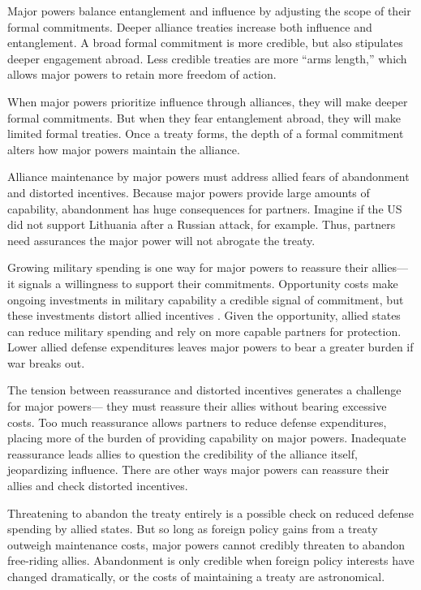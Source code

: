 \documentclass[12pt]{article}
\begin{document}
Major powers balance entanglement and influence by adjusting the scope of their formal commitments. 
Deeper alliance treaties increase both influence and entanglement. 
A broad formal commitment is more credible, but also stipulates deeper engagement abroad. 
Less credible treaties are more ``arms length,'' which allows major powers to retain more freedom of action. 


When major powers prioritize influence through alliances, they will make deeper formal commitments.
But when they fear entanglement abroad, they will make limited formal treaties. 
Once a treaty forms, the depth of a formal commitment alters how major powers maintain the alliance. 


Alliance maintenance by major powers must address allied fears of abandonment and distorted incentives. 
Because major powers provide large amounts of capability, abandonment has huge consequences for partners. 
Imagine if the US did not support Lithuania after a Russian attack, for example. 
Thus, partners need assurances the major power will not abrogate the treaty. 


Growing military spending is one way for major powers to reassure their allies--- it signals a willingness to support their commitments. 
Opportunity costs make ongoing investments in military capability a credible signal of commitment, but these investments distort allied incentives \citep{Lake1996, Lake2009}. 
Given the opportunity, allied states can reduce military spending and rely on more capable partners for protection.
Lower allied defense expenditures leaves major powers to bear a greater burden if war breaks out. 


The tension between reassurance and distorted incentives generates a challenge for major powers--- they must reassure their allies without bearing excessive costs.
Too much reassurance allows partners to reduce defense expenditures, placing more of the burden of providing capability on major powers. 
Inadequate reassurance leads allies to question the credibility of the alliance itself, jeopardizing influence.   
There are other ways major powers can reassure their allies and check distorted incentives. 


Threatening to abandon the treaty entirely is a possible check on reduced defense spending by allied states. 
But so long as foreign policy gains from a treaty outweigh maintenance costs, major powers cannot credibly threaten to abandon free-riding allies. 
Abandonment is only credible when foreign policy interests have changed dramatically, or the costs of maintaining a treaty are astronomical. 
\end{document}
